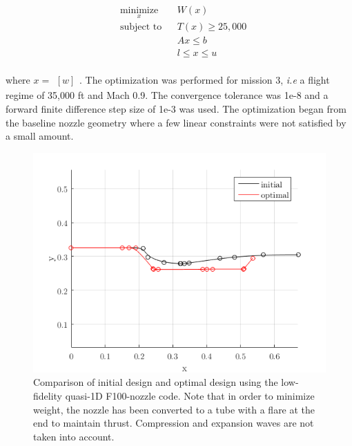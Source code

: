 \documentclass{article}
\newcommand{\irow}[1]{%
  \begin{smallmatrix}[#1]\end{smallmatrix}%
}
\begin{document}
\begin{equation}
\label{eq:minWeightLowFiSimplified}
\begin{aligned}
& \underset{x}{\text{minimize}}
& & W(x) \\
& \text{subject to}
& & T(x) \geq 25,000 \\
& & & A x \leq b \\
& & & l \leq x \leq u \\
\end{aligned}
\end{equation}

where $x = \irow{w}$. The optimization was performed for mission 3, \textit{i.e} a flight regime of 35,000 ft and Mach 0.9. The convergence tolerance was 1e-8 and a forward finite difference step size of 1e-3 was used. The optimization began from the baseline nozzle geometry where a few linear constraints were not satisfied by a small amount.

\begin{figure}
\caption{Comparison of initial design and optimal design using the low-fidelity quasi-1D F100-nozzle code. Note that in order to minimize weight, the nozzle has been converted to a tube with a flare at the end to maintain thrust. Compression and expansion waves are not taken into account.}
\label{fig:minWeightLofiSimpleResults}
\begin{center}
\includegraphics[scale=0.5]{figs/det_lowfi_result.png}
\end{center}
\end{figure}
\end{document}
